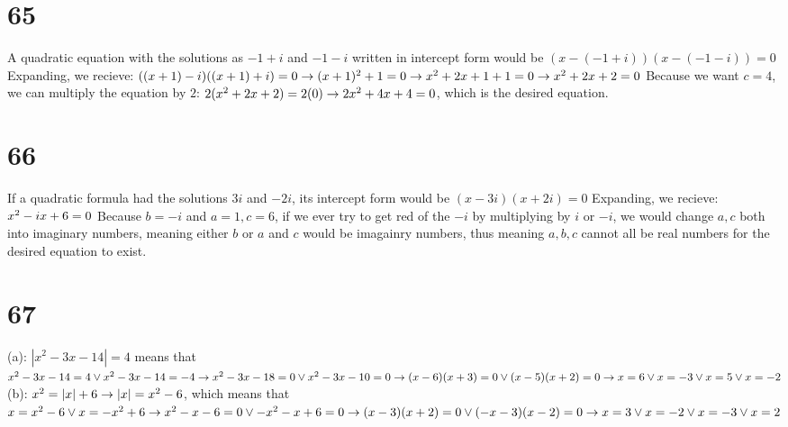 \documentclass{article}
\theoremstyle{definition}
\begin{document}
\section*{65}
A quadratic equation with the solutions as $-1+i$ and $-1-i$ written in intercept form would be $(x-(-1+i))(x-(-1-i))=0$ Expanding, we recieve:\newline 
$((x+1)-i)((x+1)+i)=0\newline\rightarrow
(x+1)^2+1=0\newline\rightarrow 
x^2+2x+1+1=0\newline\rightarrow 
x^2+2x+2=0$ Because we want $c=4$, we can multiply the equation by $2$:\newline 
$2(x^2+2x+2)=2(0)\newline\rightarrow 
2x^2+4x+4=0$, which is the desired equation.

\section*{66}
If a quadratic formula had the solutions $3i$ and $-2i$, its intercept form would be $(x-3i)(x+2i)=0$ Expanding, we recieve:\newline 
$x^2-ix+6=0\newline$ Because $b=-i$ and $a=1,c=6$, if we ever try to get red of the $-i$ by multiplying by $i$ or $-i$, we would change 
$a,c$ both into imaginary numbers, meaning either $b$ or $a$ and $c$ would be imagainry numbers, thus meaning $a,b,c$ cannot all be real numbers for 
the desired equation to exist.

\section*{67}
(a): $|x^2-3x-14|=4$ means that $x^2-3x-14=4\vee x^2-3x-14=-4\newline\rightarrow 
x^2-3x-18=0\vee x^2-3x-10=0\newline\rightarrow 
(x-6)(x+3)=0\vee (x-5)(x+2)=0\newline\rightarrow 
x=6\vee x=-3\vee x=5\vee x=-2$\newline
(b): $x^2=|x|+6\newline\rightarrow |x|=x^2-6$, which means that $x=x^2-6\vee x=-x^2+6\newline\rightarrow 
x^2-x-6=0\vee -x^2-x+6=0\newline\rightarrow 
(x-3)(x+2)=0\vee (-x-3)(x-2)=0\newline\rightarrow 
x=3\vee x=-2\vee x=-3\vee x=2$
\end{document}

